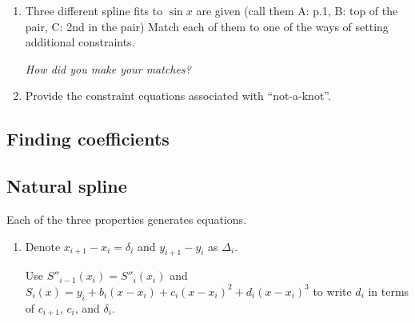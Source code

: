\documentclass[12pt,letterpaper,noanswers]{exam}
\begin{document}
\begin{enumerate}[resume]
    \item Three different spline fits to $\sin x$ are given (call them A: p.1, B: top of the pair, C: 2nd in the pair)  Match each of them to one of the ways of setting additional constraints.
    
    \emph{How did you make your matches?}
    
    \vspace{1cm}
    
    \item Provide the constraint equations associated with ``not-a-knot''.
\vspace{1in}
    
\end{enumerate}

\subsection*{Finding coefficients}

\subsection*{Natural spline}

Each of the three properties generates equations.
\begin{enumerate}[resume]
\item Denote $x_{i+1}-x_i = \delta_i$ and $y_{i+1}-y_i$ as $\Delta_i$.  

Use $S''_{i-1}(x_i) = S''_i(x_i)$ and $S_i(x) = y_i + b_i(x-x_i) + c_i(x-x_i)^2 + d_i(x-x_i)^3$ to write $d_{i}$ in terms of $c_{i+1}$, $c_i$, and $\delta_i$.

\vspace{1in}


\end{enumerate}
\end{document}
